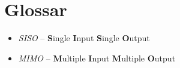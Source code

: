 \documentclass[
  10pt,
  a4paper,
  german]{article}
\providecommand{\tightlist}{%
  \setlength{\itemsep}{0pt}\setlength{\parskip}{0pt}}\usepackage{longtable,booktabs,array}
\numberwithin{equation}{section}
\begin{document}
\hypertarget{glossar}{%
\section{Glossar}\label{glossar}}

\begin{itemize}
\tightlist
\item
  \emph{SISO} -- \textbf{S}ingle \textbf{I}nput \textbf{S}ingle
  \textbf{O}utput
\item
  \emph{MIMO} -- \textbf{M}ultiple \textbf{I}nput \textbf{M}ultiple
  \textbf{O}utput
\end{itemize}
\end{document}
